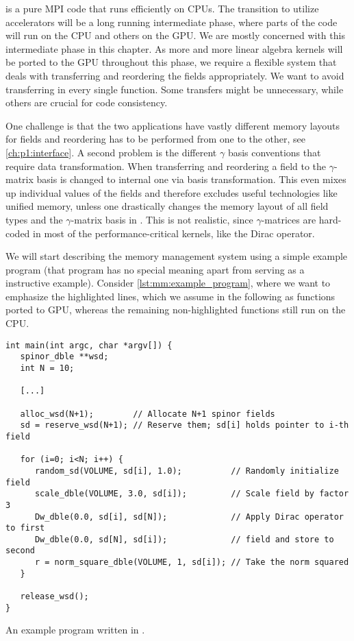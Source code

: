 \Openqxd is a pure MPI code that runs efficiently on CPUs.
The transition to utilize accelerators will be a long running intermediate phase, where parts of the code will run on the CPU and others on the GPU.
We are mostly concerned with this intermediate phase in this chapter.
As more and more linear algebra kernels will be ported to the GPU throughout this phase, we require a flexible system that deals with transferring and reordering the fields appropriately.
We want to avoid transferring in every single function.
Some transfers might be unnecessary, while others are crucial for code consistency.

One challenge is that the two applications have vastly different memory layouts for fields and reordering has to be performed from one to the other, see \cref{ch:p1:interface}.
A second problem is the different $\gamma$ basis conventions that require data transformation.
When transferring and reordering a field to \quda the $\gamma$-matrix basis is changed to \qudas internal one via basis transformation.
This even mixes up individual values of the fields and therefore excludes useful technologies like unified memory, unless one drastically changes the memory layout of all field types and the $\gamma$-matrix basis in \openqxd.
This is not realistic, since $\gamma$-matrices are hard-coded in most of the performance-critical kernels, like the Dirac operator.

We will start describing the memory management system using a simple example program (that program has no special meaning apart from serving as a instructive example).
Consider \cref{lst:mm:example_program}, where we want to emphasize the highlighted lines, which we assume in the following as functions ported to GPU, whereas the remaining non-highlighted functions still run on the CPU.
\begin{codelisting}
\begin{verbatim}
int main(int argc, char *argv[]) {
   spinor_dble **wsd;
   int N = 10;

   [...]

   alloc_wsd(N+1);        // Allocate N+1 spinor fields
   sd = reserve_wsd(N+1); // Reserve them; sd[i] holds pointer to i-th field

   for (i=0; i<N; i++) {
      random_sd(VOLUME, sd[i], 1.0);          // Randomly initialize field
      scale_dble(VOLUME, 3.0, sd[i]);         // Scale field by factor 3
      Dw_dble(0.0, sd[i], sd[N]);             // Apply Dirac operator to first
      Dw_dble(0.0, sd[N], sd[i]);             // field and store to second
      r = norm_square_dble(VOLUME, 1, sd[i]); // Take the norm squared
   }

   release_wsd();
}
\end{verbatim}
\caption{An example program written in \openqxd.}
\label{lst:mm:example_program}
\end{codelisting}

